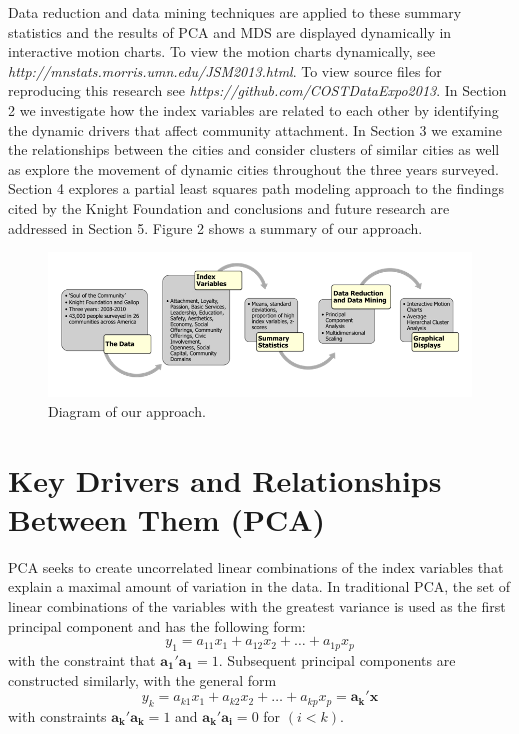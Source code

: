 \documentclass[11pt]{asaproc}
\begin{document}
Data reduction and data mining techniques are applied to these
summary statistics and the results of PCA and MDS are displayed dynamically in
interactive motion charts. To view the motion charts dynamically, see 
\textit{http://mnstats.morris.umn.edu/JSM2013.html}. To view source files for reproducing this research see  
\textit{https://github.com/COSTDataExpo2013}. In Section 2 we investigate how
the index variables are related to each other by identifying the
dynamic drivers that affect community attachment. In
Section 3 we examine the relationships between the
cities and consider clusters of similar cities as well as explore the
movement of dynamic cities throughout the three years
surveyed. Section 4 explores a partial least squares path modeling 
approach to the findings cited by the Knight Foundation and
conclusions and future research are addressed in Section 5. Figure 2 shows a summary of our approach. 

\pagebreak

\begin{figure}[h]
\begin{center}
\includegraphics[width=150mm]{chart.png}
\caption{Diagram of our approach.}
\label{fig:chart}
\end{center}
\end{figure}


\section{Key Drivers and Relationships Between Them (PCA)}
PCA seeks to create uncorrelated linear combinations of
the index variables that explain a maximal amount of variation in the
data. In traditional PCA, the set of linear
combinations of the variables with the greatest variance is used as
the first principal component and has the following form: 
\begin{equation}
y_{1} = a_{11}x_{1} + a_{12}x_{2} + \dots + a_{1p}x_{p}
\end{equation}
 with the constraint
that $\mathbf{a_{1}'a_{1}} = 1$. Subsequent principal components are
constructed similarly, with the general form
\begin{equation}
 y_{k} = a_{k1}x_{1} + a_{k2}x_{2} + \dots + a_{kp}x_{p} =
 \mathbf{a_{k}'x}
\end{equation}
 with constraints
$\mathbf{a_{k}'a_{k}} = 1$ and $\mathbf{a_{k}'a_{i}} = 0$ for $(i<k)$.  
\end{document}
